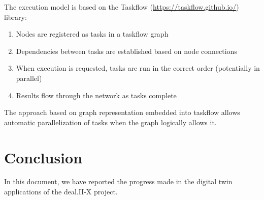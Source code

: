 \documentclass[a4paper,12pt]{article}
\begin{document}
The execution model is based on the Taskflow (\url{https://taskflow.github.io/}) library:
\begin{enumerate}
  \item Nodes are registered as tasks in a taskflow graph
  \item Dependencies between tasks are established based on node connections
  \item When execution is requested, tasks are run in the correct order (potentially in parallel)
  \item Results flow through the network as tasks complete
\end{enumerate}
The approach based on graph representation embedded into taskflow allows automatic parallelization of tasks when the graph logically allows it.

\newpage

\section{{Conclusion}} \label{sec:conclusion}

In this document, we have reported the progress made in the digital twin applications of the deal.II-X project.




\label{MyLastPage}
\end{document}
